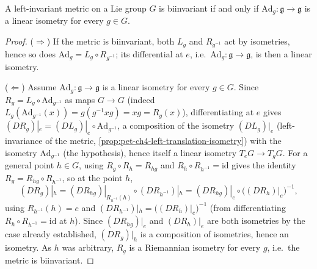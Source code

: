 \begin{proposition}
  \label{prop:pet-ch4-biinvariant-criterion}
  A left-invariant metric on a Lie group $G$ is biinvariant if and only if
  $\mathrm{Ad}_g:\mathfrak g\to\mathfrak g$ is a linear isometry for every $g\in G$.
\end{proposition}
\begin{proof}
  ($\Rightarrow$) If the metric is biinvariant, both $L_g$ and $R_{g^{-1}}$ act
  by isometries, hence so does $\mathrm{Ad}_g=L_g\circ R_{g^{-1}}$; its
  differential at $e$, i.e.\ $\mathrm{Ad}_g:\mathfrak g\to\mathfrak g$, is then a
  linear isometry.

  ($\Leftarrow$) Assume $\mathrm{Ad}_g:\mathfrak g\to\mathfrak g$ is a linear isometry
  for every $g\in G$. Since $R_g=L_g\circ\mathrm{Ad}_{g^{-1}}$ as maps $G\to G$
  (indeed $L_g(\mathrm{Ad}_{g^{-1}}(x))=g(g^{-1}xg)=xg=R_g(x)$), differentiating at
  $e$ gives $(DR_g)|_e=(DL_g)|_e\circ\mathrm{Ad}_{g^{-1}}$, a composition of the
  isometry $(DL_g)|_e$ (left-invariance of the metric,
  \cref{prop:pet-ch4-left-translation-isometry}) with the isometry
  $\mathrm{Ad}_{g^{-1}}$ (the hypothesis), hence itself a linear isometry
  $T_eG\to T_gG$. For a general point $h\in G$, using $R_g\circ R_h=R_{hg}$ and
  $R_h\circ R_{h^{-1}}=\mathrm{id}$ gives the identity
  $R_g=R_{hg}\circ R_{h^{-1}}$, so at the point $h$,
  \[
    (DR_g)|_h=(DR_{hg})|_{R_{h^{-1}}(h)}\circ(DR_{h^{-1}})|_h
    =(DR_{hg})|_e\circ\big((DR_h)|_e\big)^{-1},
  \]
  using $R_{h^{-1}}(h)=e$ and $(DR_{h^{-1}})|_h=\big((DR_h)|_e\big)^{-1}$ (from
  differentiating $R_h\circ R_{h^{-1}}=\mathrm{id}$ at $h$). Since
  $(DR_{hg})|_e$ and $(DR_h)|_e$ are both isometries by the case already
  established, $(DR_g)|_h$ is a composition of isometries, hence an isometry.
  As $h$ was arbitrary, $R_g$ is a Riemannian isometry for every $g$, i.e.\ the
  metric is biinvariant.
\end{proof}

